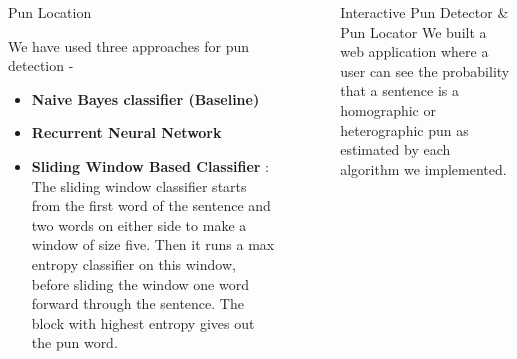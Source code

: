 \documentclass[final]{beamer}
\newlength{\sepwid}
\newlength{\onecolwid}
\newlength{\twocolwid}
\begin{document}
\begin{frame}[t]
\begin{columns}[t]
\begin{column}{\twocolwid}
\begin{columns}[t,totalwidth=\twocolwid]
\begin{column}{\onecolwid}
\begin{block}{Pun Location}
{							We have used three approaches for pun detection - 
							\begin{itemize}
							\item {\textbf{Naive Bayes classifier (Baseline)}}
							\item {\textbf{Recurrent Neural Network} %
							}
							\item {\textbf{Sliding Window Based Classifier} : The sliding window classifier starts from the first word of the sentence and two words on either side to make a window of size five. Then it runs a max entropy classifier on this window, before sliding the window one word forward through the sentence. The block with highest entropy gives out the pun word.}
							\end{itemize}
							\\
						}
					\end{block}
				\end{column}
				\begin{column}{\sepwid}\end{column} %
			\end{columns}
		\end{column}
		\begin{column}{\sepwid}\end{column} %
		\begin{column}{\onecolwid}
            
			\begin{block}{Interactive Pun Detector \& Pun Locator}
				\large{
					We built a web application where a user can see the probability that a sentence is a homographic or heterographic pun as estimated by each algorithm we implemented.
				}


\end{block}
\end{column}
\end{columns}
\end{frame}
\end{document}
